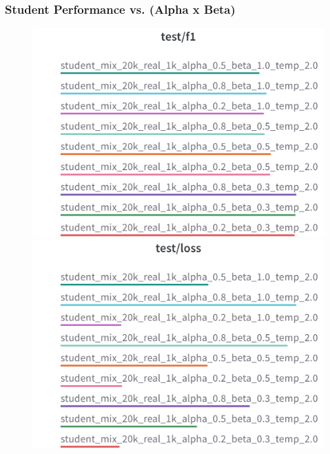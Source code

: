 \subsubsection{Student Performance vs. (Alpha x Beta)}

\begin{figure}[H]
  \includegraphics[width=\linewidth]{./reports/alpha_x_beta/charts/Section-2-Panel-0-bzllpaljk.png}
  \caption{}
  \endminipage\hfill
  \includegraphics[width=\linewidth]{./reports/alpha_x_beta/charts/Section-2-Panel-1-ul2vxqdgl.png}
  \caption{}
  \endminipage
\end{figure}

